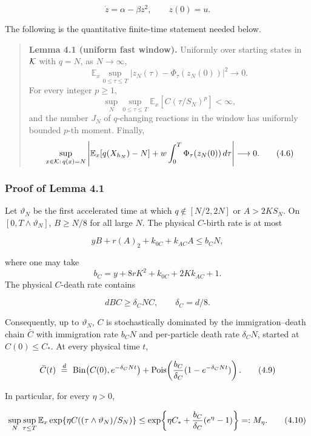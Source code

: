 \[
 \dot z=\alpha-\beta z^2,\qquad z(0)=u.                    \tag{4.3}
\]

The following is the quantitative finite-time statement needed below.

\begin{quote}
\textbf{Lemma 4.1 (uniform fast window).} Uniformly over starting states
in \({\cal K}\) with \(q=N\), as \(N\to\infty\), \[
\mathbb E_x\sup_{0\le\tau\le T}
  |z_N(\tau)-\Phi_\tau(z_N(0))|^2\longrightarrow0.        \tag{4.4}
\] For every integer \(p\ge1\), \[
\sup_N\sup_{0\le\tau\le T}
  \mathbb E_x[C(\tau/S_N)^p]<\infty,                     \tag{4.5}
\] and the number \(J_N\) of \(q\)-changing reactions in the window has
uniformly bounded \(p\)-th moment. Finally, \[
\sup_{x\in{\cal K}:\,q(x)=N}\left|
\mathbb E_x[q(X_{h_N})-N]
+w\int_0^T\Phi_\tau(z_N(0))\,d\tau\right|
\longrightarrow0.                                      \tag{4.6}
\]
\end{quote}

\subsubsection{Proof of Lemma 4.1}

Let \(\vartheta_N\) be the first accelerated time at which
\(q\notin[N/2,2N]\) or \(A>2KS_N\). On \([0,T\wedge\vartheta_N]\),
\(B\ge N/8\) for all large \(N\). The physical \(C\)-birth rate is at
most

\[
 yB+r(A)_2+k_{0C}+k_{AC}A\le b_CN,                         \tag{4.7}
\]

where one may take \[
 b_C=y+8rK^2+k_{0C}+2Kk_{AC}+1.
\] The physical \(C\)-death rate contains

\[
 dBC\ge\delta_CN C,\qquad \delta_C=d/8.                    \tag{4.8}
\]

Consequently, up to \(\vartheta_N\), \(C\) is stochastically dominated
by the immigration--death chain \(\bar C\) with immigration rate
\(b_CN\) and per-particle death rate \(\delta_CN\), started at
\(C(0)\le C_*\). At every physical time \(t\),

\[
\bar C(t)\ \stackrel d=\ {\rm Bin}\!\left(C(0),e^{-\delta_CNt}\right)
 +{\rm Pois}\!\left({b_C\over\delta_C}
             (1-e^{-\delta_CNt})\right).                  \tag{4.9}
\]

In particular, for every \(\eta>0\),

\[
 \sup_N\sup_{\tau\le T}
 \mathbb E_x\exp\{\eta C((\tau\wedge\vartheta_N)/S_N)\}
 \le
 \exp\!\left\{\eta C_*+{b_C\over\delta_C}(e^\eta-1)\right\}
 =:M_\eta.                                                \tag{4.10}
\]

